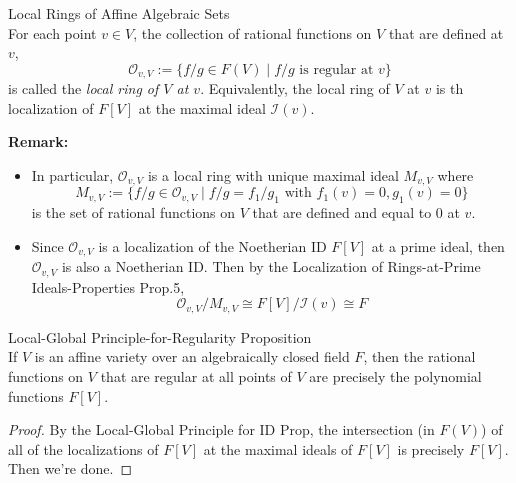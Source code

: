 \begin{definition}{Local Rings of Affine Algebraic Sets}\\
For each point $v \in V$, the collection of rational functions on $V$ that are defined at $v$,
$$\mathcal{O}_{v,V} := \{f/g \in F(V) \mid f/g \text{ is regular at }v\}$$
is called the \textit{local ring of $V$ at $v$}. Equivalently, the local ring of $V$ at $v$ is th localization of $F[V]$ at the maximal ideal $\mathcal{I}(v)$.
\end{definition}

\noindent\textbf{Remark:} \begin{itemize}
    \item In particular, $\mathcal{O}_{v,V}$ is a local ring with unique maximal ideal $M_{v,V}$ where
    $$M_{v,V}:= \{ f/g\in \mathcal{O}_{v,V} \mid f/g=f_1/g_1 \text{ with } f_1(v) =0, g_1(v)=0 \}$$
    is the set of rational functions on $V$ that are defined and equal to $0$ at $v$.

    \item Since $\mathcal{O}_{v,V}$ is a localization of the Noetherian ID $F[V]$ at a prime ideal, then $\mathcal{O}_{v,V}$ is also a Noetherian ID. Then by the Localization of Rings-at-Prime Ideals-Properties Prop.5,
    $$\mathcal{O}_{v,V}/ M_{v,V} \cong F[V]/\mathcal{I} (v) \cong F$$
\end{itemize}

\begin{proposition}{Local-Global Principle-for-Regularity Proposition}\\
If $V$ is an affine variety over an algebraically closed field $F$, then the rational functions on $V$ that are regular at all points of $V$ are precisely the polynomial functions $F[V]$.
\end{proposition}

\begin{proof}
    By the Local-Global Principle for ID Prop, the intersection (in $F(V)$) of all of the localizations of $F[V]$ at the maximal ideals of $F[V]$ is precisely $F[V]$. Then we're done.
\end{proof}

